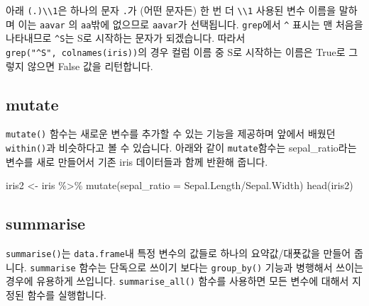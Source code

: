 \documentclass[
]{book}
\newenvironment{Shaded}{\begin{snugshade}}{\end{snugshade}}
\newcommand{\AttributeTok}[1]{\textcolor[rgb]{0.77,0.63,0.00}{#1}}
\newcommand{\FunctionTok}[1]{\textcolor[rgb]{0.00,0.00,0.00}{#1}}
\newcommand{\NormalTok}[1]{#1}
\newcommand{\OtherTok}[1]{\textcolor[rgb]{0.56,0.35,0.01}{#1}}
\newcommand{\SpecialCharTok}[1]{\textcolor[rgb]{0.00,0.00,0.00}{#1}}
\begin{document}
아래 \texttt{(.)\textbackslash{}\textbackslash{}1}은 하나의 문자 \texttt{.}가 (어떤 문자든) 한 번 더 \texttt{\textbackslash{}\textbackslash{}1} 사용된 변수 이름을 말하며 이는 \texttt{aavar} 의 \texttt{aa}밖에 없으므로 \texttt{aavar}가 선택됩니다. \texttt{grep}에서 \texttt{\^{}} 표시는 맨 처음을 나타내므로 \texttt{\^{}S}는 S로 시작하는 문자가 되겠습니다. 따라서 \texttt{grep("\^{}S",\ colnames(iris))}의 경우 컬럼 이름 중 S로 시작하는 이름은 True로 그렇지 않으면 False 값을 리턴합니다.

\hypertarget{mutate}{%
\subsection{mutate}\label{mutate}}

\texttt{mutate()} 함수는 새로운 변수를 추가할 수 있는 기능을 제공하며 앞에서 배웠던 \texttt{within()}과 비슷하다고 볼 수 있습니다. 아래와 같이 \texttt{mutate}함수는 sepal\_ratio라는 변수를 새로 만들어서 기존 iris 데이터들과 함께 반환해 줍니다.

\begin{Shaded}
\begin{Highlighting}[]
\NormalTok{iris2 }\OtherTok{\textless{}{-}}\NormalTok{ iris }\SpecialCharTok{\%\textgreater{}\%} \FunctionTok{mutate}\NormalTok{(}\AttributeTok{sepal\_ratio =}\NormalTok{ Sepal.Length}\SpecialCharTok{/}\NormalTok{Sepal.Width)}
\FunctionTok{head}\NormalTok{(iris2)}
\end{Highlighting}
\end{Shaded}

\hypertarget{summarise}{%
\subsection{summarise}\label{summarise}}

\texttt{summarise()}는 \texttt{data.frame}내 특정 변수의 값들로 하나의 요약값/대푯값을 만들어 줍니다. \texttt{summarise} 함수는 단독으로 쓰이기 보다는 \texttt{group\_by()} 기능과 병행해서 쓰이는 경우에 유용하게 쓰입니다. \texttt{summarise\_all()} 함수를 사용하면 모든 변수에 대해서 지정된 함수를 실행합니다.
\end{document}
